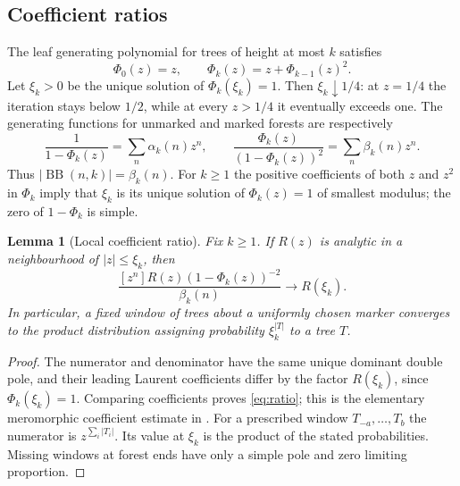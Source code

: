 \documentclass[11pt,a4paper]{article}
\newtheorem{lemma}[theorem]{Lemma}
\theoremstyle{definition}
\theoremstyle{remark}
\newcommand{\BB}{\operatorname{BB}}
\begin{document}
\subsection{Coefficient ratios}
The leaf generating polynomial for trees of height at most $k$ satisfies
\begin{equation}\label{eq:phi}
\Phi_0(z)=z,\qquad \Phi_k(z)=z+\Phi_{k-1}(z)^2.
\end{equation}
Let $\xi_k>0$ be the unique solution of $\Phi_k(\xi_k)=1$. Then $\xi_k\downarrow1/4$: at $z=1/4$ the iteration stays below $1/2$, while at every $z>1/4$ it eventually exceeds one. The generating functions for unmarked and marked forests are respectively
\begin{equation}\label{eq:forestGF}
\frac1{1-\Phi_k(z)}=\sum_n\alpha_k(n)z^n,\qquad
\frac{\Phi_k(z)}{(1-\Phi_k(z))^2}=\sum_n\beta_k(n)z^n.
\end{equation}
Thus $|\BB(n,k)|=\beta_k(n)$. For $k\ge1$ the positive coefficients of both $z$ and $z^2$ in $\Phi_k$ imply that $\xi_k$ is its unique solution of $\Phi_k(z)=1$ of smallest modulus; the zero of $1-\Phi_k$ is simple.

\begin{lemma}[Local coefficient ratio]\label{lem:ratio}
Fix $k\ge1$. If $R(z)$ is analytic in a neighbourhood of $|z|\le\xi_k$, then
\begin{equation}\label{eq:ratio}
\frac{[z^n]R(z)(1-\Phi_k(z))^{-2}}{\beta_k(n)}\longrightarrow R(\xi_k).
\end{equation}
In particular, a fixed window of trees about a uniformly chosen marker converges to the product distribution assigning probability $\xi_k^{|T|}$ to a tree $T$.
\end{lemma}
\begin{proof}
The numerator and denominator have the same unique dominant double pole, and their leading Laurent coefficients differ by the factor $R(\xi_k)$, since $\Phi_k(\xi_k)=1$. Comparing coefficients proves \eqref{eq:ratio}; this is the elementary meromorphic coefficient estimate in \cite[Theorem IV.10]{FS}. For a prescribed window $T_{-a},\ldots,T_b$ the numerator is $z^{\sum_i|T_i|}$. Its value at $\xi_k$ is the product of the stated probabilities. Missing windows at forest ends have only a simple pole and zero limiting proportion.
\end{proof}
\end{document}
